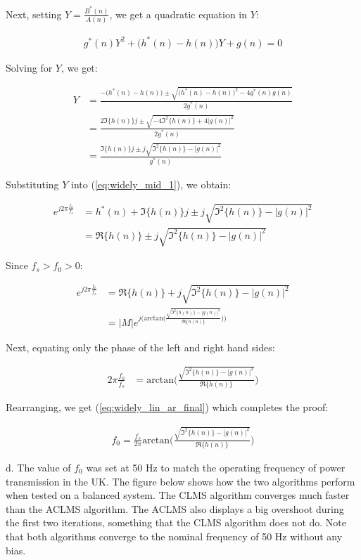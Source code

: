 \noindent{}Next, setting $Y=\frac{B^*(n)}{A(n)}$, we get a quadratic equation in $Y$:

\begin{align*}
g^*(n)Y^2 + \big(h^*(n)-h(n)\big)Y + g(n) = 0
\end{align*}

\noindent{}Solving for $Y$, we get:

\begin{align*}
Y &= \frac{-\big(h^*(n)-h(n)\big) \pm \sqrt{\big(h^*(n)-h(n)\big)^2-4g^*(n)g(n)}}{2g^*(n)} \\
&= \frac{2\Im\{h(n)\}j \pm \sqrt{-4\Im^2\{h(n)\}+4|g(n)|^2}}{2g^*(n)} \\
&= \frac{\Im\{h(n)\}j \pm j\sqrt{\Im^2\{h(n)\}-|g(n)|^2}}{g^*(n)}
\end{align*}

\noindent{}Substituting $Y$ into (\ref{eq:widely_mid_1}), we obtain:

\begin{align*}
e^{j2\pi\frac{f_0}{f_s}} &= h^*(n) + \Im\{h(n)\}j \pm j\sqrt{\Im^2\{h(n)\}-|g(n)|^2} \\
&= \Re\{h(n)\} \pm j\sqrt{\Im^2\{h(n)\}-|g(n)|^2}
\end{align*}

\noindent{}Since $f_s > f_0 > 0$:

\begin{align*}
e^{j2\pi\frac{f_0}{f_s}}  &= \Re\{h(n)\} + j\sqrt{\Im^2\{h(n)\}-|g(n)|^2} \\
&= |M| e^{j\big(\text{arctan}\big(\frac{\sqrt{\Im^2\{h(n)\}-|g(n)|^2}}{\Re\{h(n)\}}\big)\big)}
\end{align*}

\noindent{}Next, equating only the phase of the left and right hand sides:

\begin{align*}
2\pi\frac{f_0}{f_s}  &= \text{arctan}\bigg(\frac{\sqrt{\Im^2\{h(n)\}-|g(n)|^2}}{\Re\{h(n)\}}\bigg)
\end{align*}

\noindent{}Rearranging, we get (\ref{eq:widely_lin_ar_final}) which completes the proof:

\begin{align}
f_0 = \frac{f_s}{2\pi} \text{arctan}\bigg(\frac{\sqrt{\Im^2\{h(n)\}-|g(n)|^2}}{\Re\{h(n)\}}\bigg) \label{eq:widely_lin_ar_final}
\end{align}

\noindent{}d. The value of $f_0$ was set at 50 Hz to match the operating frequency of power transmission in the UK. The figure below shows how the two algorithms perform when tested on a balanced system. The CLMS algorithm converges much faster than the ACLMS algorithm. The ACLMS also displays a big overshoot during the first two iterations, something that the CLMS algorithm does not do. Note that both algorithms converge to the nominal frequency of 50 Hz without any bias.

